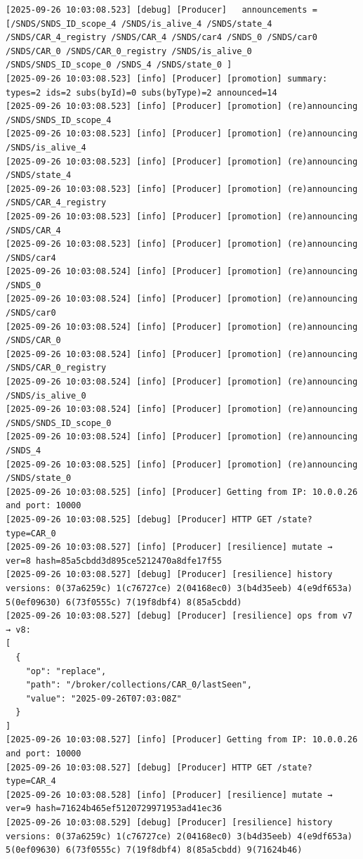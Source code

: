\documentclass{article}
\begin{document}
\begin{lstlisting}[language=log, caption={E's recovery logs}, label={lst:e-recovery-logs}]
[2025-09-26 10:03:08.523] [debug] [Producer]   announcements = [/SNDS/SNDS_ID_scope_4 /SNDS/is_alive_4 /SNDS/state_4 /SNDS/CAR_4_registry /SNDS/CAR_4 /SNDS/car4 /SNDS_0 /SNDS/car0 /SNDS/CAR_0 /SNDS/CAR_0_registry /SNDS/is_alive_0 /SNDS/SNDS_ID_scope_0 /SNDS_4 /SNDS/state_0 ]
[2025-09-26 10:03:08.523] [info] [Producer] [promotion] summary: types=2 ids=2 subs(byId)=0 subs(byType)=2 announced=14
[2025-09-26 10:03:08.523] [info] [Producer] [promotion] (re)announcing /SNDS/SNDS_ID_scope_4
[2025-09-26 10:03:08.523] [info] [Producer] [promotion] (re)announcing /SNDS/is_alive_4
[2025-09-26 10:03:08.523] [info] [Producer] [promotion] (re)announcing /SNDS/state_4
[2025-09-26 10:03:08.523] [info] [Producer] [promotion] (re)announcing /SNDS/CAR_4_registry
[2025-09-26 10:03:08.523] [info] [Producer] [promotion] (re)announcing /SNDS/CAR_4
[2025-09-26 10:03:08.523] [info] [Producer] [promotion] (re)announcing /SNDS/car4
[2025-09-26 10:03:08.524] [info] [Producer] [promotion] (re)announcing /SNDS_0
[2025-09-26 10:03:08.524] [info] [Producer] [promotion] (re)announcing /SNDS/car0
[2025-09-26 10:03:08.524] [info] [Producer] [promotion] (re)announcing /SNDS/CAR_0
[2025-09-26 10:03:08.524] [info] [Producer] [promotion] (re)announcing /SNDS/CAR_0_registry
[2025-09-26 10:03:08.524] [info] [Producer] [promotion] (re)announcing /SNDS/is_alive_0
[2025-09-26 10:03:08.524] [info] [Producer] [promotion] (re)announcing /SNDS/SNDS_ID_scope_0
[2025-09-26 10:03:08.524] [info] [Producer] [promotion] (re)announcing /SNDS_4
[2025-09-26 10:03:08.525] [info] [Producer] [promotion] (re)announcing /SNDS/state_0
[2025-09-26 10:03:08.525] [info] [Producer] Getting from IP: 10.0.0.26 and port: 10000
[2025-09-26 10:03:08.525] [debug] [Producer] HTTP GET /state?type=CAR_0
[2025-09-26 10:03:08.527] [info] [Producer] [resilience] mutate → ver=8 hash=85a5cbdd3d895ce5212470a8dfe17f55
[2025-09-26 10:03:08.527] [debug] [Producer] [resilience] history versions: 0(37a6259c) 1(c76727ce) 2(04168ec0) 3(b4d35eeb) 4(e9df653a) 5(0ef09630) 6(73f0555c) 7(19f8dbf4) 8(85a5cbdd) 
[2025-09-26 10:03:08.527] [debug] [Producer] [resilience] ops from v7 → v8:
[
  {
    "op": "replace",
    "path": "/broker/collections/CAR_0/lastSeen",
    "value": "2025-09-26T07:03:08Z"
  }
]
[2025-09-26 10:03:08.527] [info] [Producer] Getting from IP: 10.0.0.26 and port: 10000
[2025-09-26 10:03:08.527] [debug] [Producer] HTTP GET /state?type=CAR_4
[2025-09-26 10:03:08.528] [info] [Producer] [resilience] mutate → ver=9 hash=71624b465ef5120729971953ad41ec36
[2025-09-26 10:03:08.529] [debug] [Producer] [resilience] history versions: 0(37a6259c) 1(c76727ce) 2(04168ec0) 3(b4d35eeb) 4(e9df653a) 5(0ef09630) 6(73f0555c) 7(19f8dbf4) 8(85a5cbdd) 9(71624b46) 

\end{lstlisting}
\end{document}
